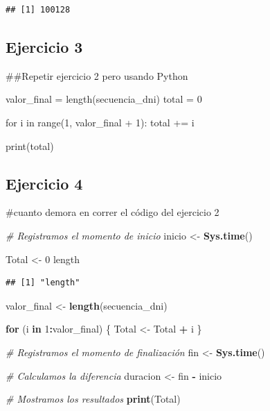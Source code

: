 \documentclass[runningheads]{llncs}
\newenvironment{Shaded}{\begin{snugshade}}{\end{snugshade}}
\newcommand{\CommentTok}[1]{\textcolor[rgb]{0.56,0.35,0.01}{\textit{#1}}}
\newcommand{\ControlFlowTok}[1]{\textcolor[rgb]{0.13,0.29,0.53}{\textbf{#1}}}
\newcommand{\DecValTok}[1]{\textcolor[rgb]{0.00,0.00,0.81}{#1}}
\newcommand{\FunctionTok}[1]{\textcolor[rgb]{0.13,0.29,0.53}{\textbf{#1}}}
\newcommand{\NormalTok}[1]{#1}
\newcommand{\OtherTok}[1]{\textcolor[rgb]{0.56,0.35,0.01}{#1}}
\newcommand{\SpecialCharTok}[1]{\textcolor[rgb]{0.81,0.36,0.00}{\textbf{#1}}}
\newcommand{\StringTok}[1]{\textcolor[rgb]{0.31,0.60,0.02}{#1}}
\begin{document}
\begin{verbatim}
## [1] 100128
\end{verbatim}

\subsection{Ejercicio 3}\label{ejercicio-3}

\#\#Repetir ejercicio 2 pero usando Python

valor\_final = length(secuencia\_dni) total = 0

for i in range(1, valor\_final + 1): total += i

print(total)

\subsection{Ejercicio 4}\label{ejercicio-4}

\#cuanto demora en correr el código del ejercicio 2

\begin{Shaded}
\begin{Highlighting}[]
\CommentTok{\# Registramos el momento de inicio}
\NormalTok{inicio }\OtherTok{\textless{}{-}} \FunctionTok{Sys.time}\NormalTok{()}

\NormalTok{Total }\OtherTok{\textless{}{-}} \DecValTok{0}
 \StringTok{\textquotesingle{}length\textquotesingle{}}
\end{Highlighting}
\end{Shaded}

\begin{verbatim}
## [1] "length"
\end{verbatim}

\begin{Shaded}
\begin{Highlighting}[]
\NormalTok{valor\_final }\OtherTok{\textless{}{-}} \FunctionTok{length}\NormalTok{(secuencia\_dni)}

\ControlFlowTok{for}\NormalTok{ (i }\ControlFlowTok{in} \DecValTok{1}\SpecialCharTok{:}\NormalTok{valor\_final) \{}
\NormalTok{  Total }\OtherTok{\textless{}{-}}\NormalTok{ Total }\SpecialCharTok{+}\NormalTok{ i}
\NormalTok{\}}

\CommentTok{\# Registramos el momento de finalización}
\NormalTok{fin }\OtherTok{\textless{}{-}} \FunctionTok{Sys.time}\NormalTok{()}

\CommentTok{\# Calculamos la diferencia}
\NormalTok{duracion }\OtherTok{\textless{}{-}}\NormalTok{ fin }\SpecialCharTok{{-}}\NormalTok{ inicio}

\CommentTok{\# Mostramos los resultados}
\FunctionTok{print}\NormalTok{(Total)}
\end{Highlighting}
\end{Shaded}
\end{document}
